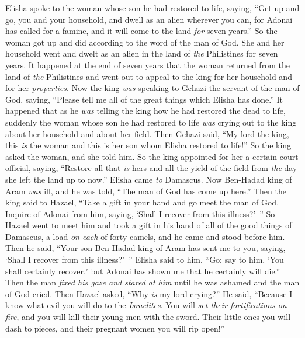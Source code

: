 \begin{biblechapter} %
 Elisha spoke to the woman whose son he had restored to life, saying, “Get up and go, you and your household, and dwell as an alien wherever you can, for Adonai has called for a famine, and it will come to the land \textit{for} seven years.”
\verse So the woman got up and did according to the word of the man of God. She and her household went and dwelt as an alien in the land of \textit{the} Philistines for seven years.
\verse It happened at the end of seven years that the woman returned from the land of \textit{the} Philistines and went out to appeal to the king for her household and for her \textit{properties}.
\verse Now the king \textit{was} speaking to Gehazi the servant of the man of God, saying, “Please tell me all of the great things which Elisha has done.”
\verse It happened that as he \textit{was} telling the king how he had restored the dead to life, suddenly the woman whose son he had restored to life \textit{was} crying out to the king about her household and about her field. Then Gehazi said, “My lord the king, this \textit{is} the woman and this is her son whom Elisha restored to life!”
\verse So the king asked the woman, and she told him. So the king appointed for her a certain court official, saying, “Restore all that \textit{is} hers and all the yield of the field from \textit{the} day she left the land up to now.”
\verse Elisha came \textit{to} Damascus. Now Ben-Hadad king of Aram \textit{was} ill, and he was told, “The man of God has come up here.”
\verse Then the king said to Hazael, “Take a gift in your hand and go meet the man of God. Inquire of Adonai from him, saying, ‘Shall I recover from this illness?’ ”
\verse So Hazael went to meet him and took a gift in his hand of all of the good things of Damascus, a load \textit{on each} of forty camels, and he came and stood before him. Then he said, “Your son Ben-Hadad king of Aram has sent me to you, saying, ‘Shall I recover from this illness?’ ”
\verse Elisha said to him, “Go; say to him, ‘You shall certainly recover,’ but Adonai has shown me that he certainly will die.”
\verse Then the man \textit{fixed his gaze and stared at him} until he was ashamed and the man of God cried.
\verse Then Hazael asked, “Why \textit{is} my lord crying?” He said, “Because I know what evil you will do to the \textit{Israelites}. You will \textit{set their fortifications on fire}, and you will kill their young men with the sword. Their little ones you will dash to pieces, and their pregnant women you will rip open!”

\end{biblechapter}
